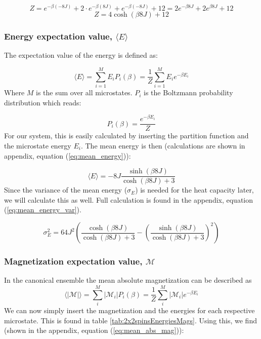 \documentclass[../main.tex]{subfiles}
\begin{document}
\[Z = e^{-\beta (-8J)} + 2 \cdot e^{-\beta (8J)} + e^{-\beta (-8J)} + 12 = 2e^{-\beta 8J} + 2e^{\beta 8J} + 12\]
\[Z = 4\cosh(\beta 8J) + 12\]

\subsubsection*{Energy expectation value, $\langle E \rangle$}
The expectation value of the energy is defined as:

\[\langle E \rangle = \sum_{i=1}^M E_i P_i(\beta) = \frac{1}{Z}\sum_{i=1}^M E_i e^{-\beta E_i}\]
Where $M$ is the sum over all microstates. $P_i$ is the Boltzmann probability distribution which reads:

\[P_i(\beta) = \frac{e^{-\beta E_i}}{Z}\]
For our system, this is easily calculated by inserting the partition function and the microstate energy $E_i$. The mean energy is then (calculations are shown in appendix, equation (\ref{eq:mean_energy})):

\begin{equation*}
  \langle E \rangle = -8J\frac{\sinh(\beta 8 J)}{\cosh(\beta 8 J) + 3}
\end{equation*}
Since the variance of the mean energy ($\sigma_E$) is needed for the heat capacity later, we will calculate this as well. Full calculation is found in the appendix, equation (\ref{eq:mean_energy_var}).

\begin{equation*}
  \sigma_E^2 = 64J^2\left(\frac{\cosh(\beta 8J)}{\cosh(\beta 8 J) + 3} - \left(\frac{\sinh(\beta 8 J)}{\cosh(\beta 8 J) + 3}\right)^2\right)
\end{equation*}

\subsubsection*{Magnetization expectation value, $\mathcal{M}$}
In the canonical ensemble the mean absolute magnetization can be described as
\[\langle |\mathcal{M}| \rangle = \sum_i^M |\mathcal{M}_i| P_i(\beta) = \frac{1}{Z} \sum_i^M |\mathcal{M}_i| e^{-\beta E_i}\]
We can now simply insert the magnetization and the energies for each respective microstate. This is found in table \ref{tab:2x2spinsEnergiesMags}. Using this, we find (shown in the appendix, equation (\ref{eq:mean_abs_mag})):
\end{document}
